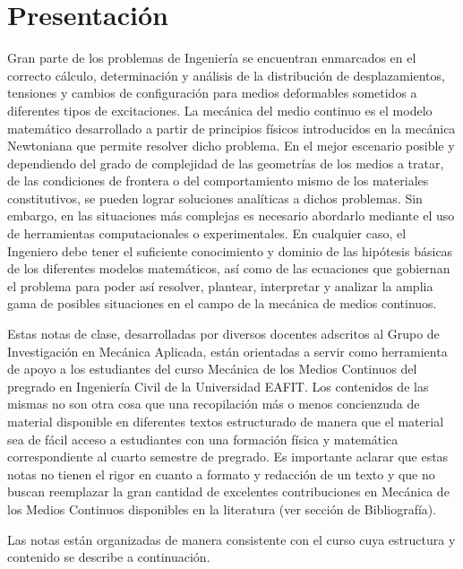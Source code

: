 \section*{Presentación}

Gran parte de los problemas de Ingeniería se encuentran enmarcados en el 
correcto cálculo, determinación y análisis de la distribución de 
desplazamientos, tensiones y cambios de configuración para medios deformables 
sometidos a diferentes tipos de excitaciones.  La mecánica del medio continuo 
es el modelo matemático desarrollado a partir de principios físicos 
introducidos en la mecánica Newtoniana que permite resolver dicho problema.  En 
el mejor escenario posible y dependiendo del grado de complejidad de las 
geometrías de los medios a tratar, de las condiciones de frontera o del 
comportamiento mismo de los materiales constitutivos, se pueden lograr 
soluciones analíticas a dichos problemas.  Sin embargo, en las situaciones más 
complejas es necesario abordarlo mediante el uso de herramientas 
computacionales o experimentales.  En cualquier caso, el Ingeniero debe tener 
el suficiente conocimiento y dominio de las hipótesis básicas de los diferentes 
modelos matemáticos, así como de las ecuaciones que gobiernan el problema para 
poder así resolver, plantear, interpretar y analizar la amplia gama de posibles 
situaciones en el campo de la mecánica de medios continuos.

Estas notas de clase, desarrolladas por diversos docentes adscritos al Grupo de 
Investigación en Mecánica Aplicada, están orientadas a servir como herramienta 
de apoyo a los estudiantes del curso Mecánica de los Medios Continuos del 
pregrado en Ingeniería Civil de la Universidad EAFIT. Los contenidos de las 
mismas no son otra cosa que una recopilación más o menos concienzuda de 
material disponible en diferentes textos estructurado de manera que el material 
sea de fácil acceso a estudiantes con una formación física y matemática 
correspondiente al cuarto semestre de pregrado. Es importante aclarar que estas 
notas no tienen el rigor en cuanto a formato y redacción de un texto y que no 
buscan reemplazar la gran cantidad de excelentes contribuciones en Mecánica de 
los Medios Continuos disponibles en la literatura (ver sección de Bibliografía).

Las notas están organizadas de manera consistente con el curso cuya estructura y contenido se describe a continuación. 

